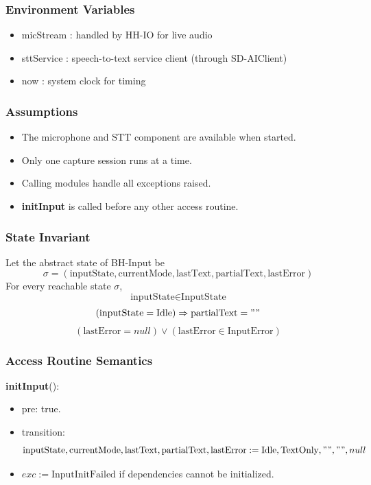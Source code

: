 \documentclass[12pt, titlepage]{article}
\begin{document}
\subsubsection{Environment Variables}

\begin{itemize}
  \item micStream : handled by HH-IO for live audio
  \item sttService : speech-to-text service client (through SD-AIClient)
  \item now : system clock for timing
\end{itemize}

\subsubsection{Assumptions}

\begin{itemize}
  \item The microphone and STT component are available when started.
  \item Only one capture session runs at a time.
  \item Calling modules handle all exceptions raised.
  \item \textbf{initInput} is called before any other access routine.
\end{itemize}

\subsubsection{State Invariant}

Let the abstract state of BH-Input be
\[
  \sigma = (\text{inputState}, \text{currentMode}, \text{lastText},
  \text{partialText}, \text{lastError})
\]
For every reachable state $\sigma$,
\[
  \text{inputState} \in \text{InputState}
\]
\[
  (\text{inputState} = \text{Idle}) \Rightarrow \text{partialText} = ""
\]
\[
  (\text{lastError} = null) \lor (\text{lastError} \in \text{InputError})
\]

\subsubsection{Access Routine Semantics}

\noindent
\textbf{initInput}():
\begin{itemize}
  \item pre: true.
  \item transition:
  \[
    \text{inputState}, \text{currentMode}, \text{lastText}, \text{partialText},
    \text{lastError}
    := \text{Idle}, \text{TextOnly}, "", "", null
  \]
  \item $exc := \text{InputInitFailed}$ if dependencies cannot be initialized.
\end{itemize}
\end{document}
